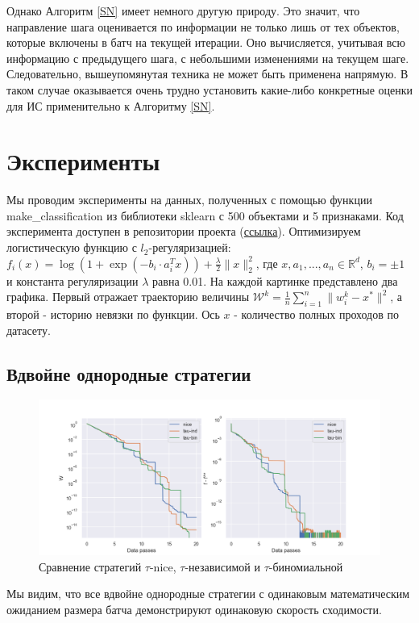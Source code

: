 \documentclass{article}
\theoremstyle{definition}
\theoremstyle{assumption}
\theoremstyle{lemma}
\theoremstyle{theorem}
\theoremstyle{proposition}
\begin{document}
	Однако Алгоритм \ref{SN} имеет немного другую природу. Это значит, что направление шага оценивается по информации не только лишь от тех объектов, которые включены в батч на текущей итерации. Оно вычисляется, учитывая всю информацию с предыдущего шага, с небольшими изменениями на текущем шаге. Следовательно, вышеупомянутая техника не может быть применена напрямую. В таком случае оказывается очень трудно установить какие-либо конкретные оценки для ИС применительно к Алгоритму \ref{SN}.
	
	\section{Эксперименты}
	
	Мы проводим эксперименты на данных, полученных с помощью функции {\selectfont make\_classification} из библиотеки {\selectfont sklearn} с 500 объектами и 5 признаками. Код эксперимента доступен в репозитории проекта (\href{https://github.com/intsystems/2023-Project-136/tree/master/code}{ссылка}). Оптимизируем логистическую функцию с $l_2$-регуляризацией: $f_i(x) = \log(1 + \exp(-b_i \cdot a_i^T x)) + \frac{\lambda}{2}\|x\|_2^2$, где $x, a_1, ..., a_n \in \mathbb R^d$, $b_i = \pm 1$ и константа регуляризации $\lambda$ равна 0.01. На каждой картинке представлено два графика. Первый отражает траекторию величины $\mathcal W^k = \frac{1}{n} \sum \limits_{i=1}^n \|w_i^k - x^* \|^2$, а второй - историю невязки по функции. Ось $x$ - количество полных проходов по датасету. 
	
	\subsection{Вдвойне однородные стратегии}
	\begin{figure}[h!]\label{fig:1}
		\centering
		\includegraphics[width=\textwidth]{uniform strategies}
		\caption{Сравнение стратегий $\tau$-nice, $\tau$-независимой и $\tau$-биномиальной}
	\end{figure}
	Мы видим, что все вдвойне однородные стратегии с одинаковым математическим ожиданием размера батча демонстрируют одинаковую скорость сходимости.
	
\end{document}
